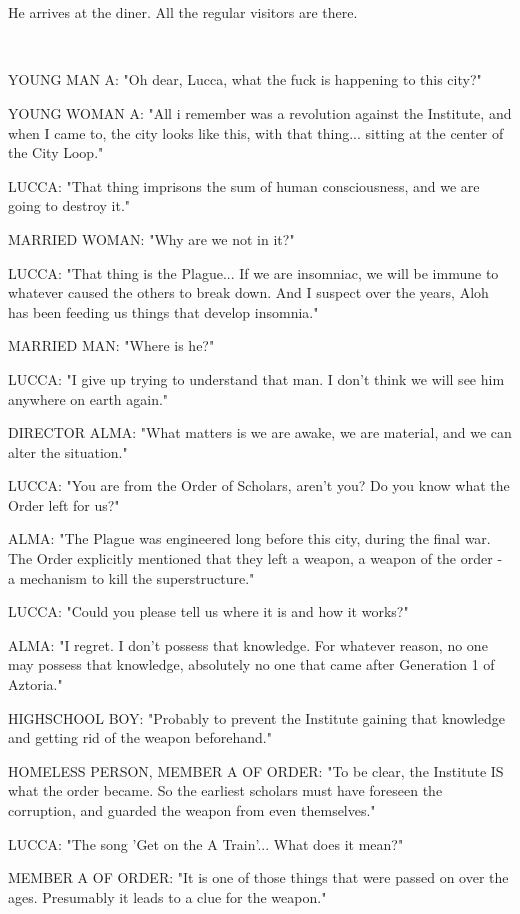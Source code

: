 \documentclass[11pt]{article}
\begin{document}
\ 

\ 

He arrives at the diner.
All the regular visitors are there. 

\ 

YOUNG MAN A: "Oh dear, Lucca, what the fuck is happening to this city?"

YOUNG WOMAN A: "All i remember was a revolution against the Institute, and when I came to, the city looks like this, with that thing... sitting at the center of the City Loop."

LUCCA: "That thing imprisons the sum of human consciousness, and we are going to destroy it."

MARRIED WOMAN: "Why are we not in it?"

LUCCA: "That thing is the Plague... If we are insomniac, we will be immune to whatever caused the others to break down.
And I suspect over the years, Aloh has been feeding us things that develop insomnia."

MARRIED MAN: "Where is he?"

LUCCA: "I give up trying to understand that man.
I don't think we will see him anywhere on earth again."

DIRECTOR ALMA: "What matters is we are awake, we are material, and we can alter the situation."

LUCCA: "You are from the Order of Scholars, aren't you? 
Do you know what the Order left for us?"

ALMA: "The Plague was engineered long before this city, during the final war. 
The Order explicitly mentioned that they left a weapon, a weapon of the order - a mechanism to kill the superstructure."

LUCCA: "Could you please tell us where it is and how it works?"

ALMA: "I regret. I don't possess that knowledge. For whatever reason, no one may possess that knowledge, absolutely no one that came after Generation 1 of Aztoria."

HIGHSCHOOL BOY: "Probably to prevent the Institute gaining that knowledge and getting rid of the weapon beforehand."

HOMELESS PERSON, MEMBER A OF ORDER: "To be clear, the Institute IS what the order became. 
So the earliest scholars must have foreseen the corruption, and guarded the weapon from even themselves."

LUCCA: "The song 'Get on the A Train'... What does it mean?"

MEMBER A OF ORDER: "It is one of those things that were passed on over the ages. 
Presumably it leads to a clue for the weapon."
\end{document}
